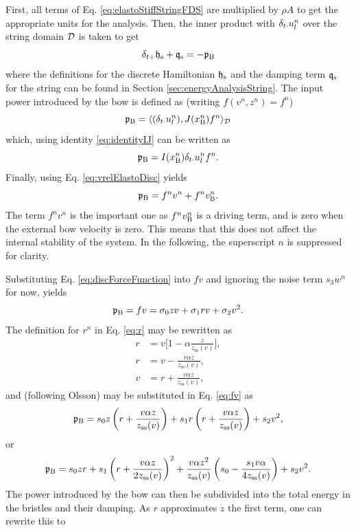 First, all terms of Eq. \eqref{eq:elastoStiffStringFDS} are multiplied by $\rho A$ to get the appropriate units for the analysis. Then, the inner product with $\delta_{t\cdot} u_l^n$ over the string domain $\mathcal{D}$ is taken to get
\begin{equation}
    \delta_{t+} \mathfrak{h}_\text{s} + \mathfrak{q}_\text{s} = -\mathfrak{p}_{\text{B}}
\end{equation}
where the definitions for the discrete Hamiltonian $\mathfrak{h}_\text{s}$ and the damping term $\mathfrak{q}_\text{s}$ for the string can be found in Section \ref{sec:energyAnalysisString}. The input power introduced by the bow is defined as (writing $f(v^n,z^n) = f^n$)
\begin{equation*}
    \mathfrak{p}_{\text{B}} = \langle (\delta_{t\cdot} u_l^n), J(x_{\text{B}}^n)f^n\rangle_{\mathcal{D}}
\end{equation*}
which, using identity \eqref{eq:identityIJ} can be written as 
\begin{equation*}
    \mathfrak{p}_{\text{B}} = I(x_\text{B}^n)\delta_{t\cdot} u_l^n f^n.
\end{equation*}
Finally, using Eq. \eqref{eq:vrelElastoDisc} yields
\begin{equation}
    \mathfrak{p}_{\text{B}} = f^nv^n + f^n v_{\text{B}}^n.
\end{equation}
The term $f^nv^n$ is the important one as $f^nv_{\text{B}}^n$ is a driving term, and is zero when the external bow velocity is zero. This means that this does not affect the internal stability of the system. In the following, the superscript $n$ is suppressed for clarity.

Substituting Eq. \eqref{eq:discForceFunction} into $fv$ and ignoring the noise term $s_3w^n$ for now, yields
\begin{equation}\label{eq:fv}
    \mathfrak{p}_{\text{B}} = fv = \sigma_{0}zv +\sigma_{1}rv+\sigma_{2}v^2.
\end{equation}
The definition for $r^n$ in Eq. \eqref{eq:r} may be rewritten as
\begin{equation*}
    \begin{aligned}
        r &= v\bigg[1-\alpha\frac{z}{z_\text{ss}(v)}\bigg],\\
        r &= v-\frac{v\alpha z}{z_\text{ss}(v)},\\
        v &= r + \frac{v\alpha z}{z_\text{ss}(v)},
    \end{aligned}
\end{equation*}
and (following Olsson) may be substituted in Eq. \eqref{eq:fv} as
\begin{equation}
    \mathfrak{p}_{\text{B}} = s_{0}z\left(r+ \frac{v\alpha z}{z_\text{ss}(v)}\right)+s_{1}r\left(r+ \frac{v\alpha z}{z_\text{ss}(v)}\right)+s_{2}v^2,
\end{equation}
or
\begin{equation}
    \mathfrak{p}_{\text{B}} = s_0zr+s_1\left(r+\frac{v\alpha z}{2z_\text{ss}(v)}\right)^2+\frac{v\alpha z^2}{z_\text{ss}(v)}\left(s_0-\frac{s_1v\alpha}{4z_\text{ss}(v)}\right)+s_2v^2.
\end{equation}
The power introduced by the bow can then be subdivided into the total energy in the bristles and their damping. As $r$ approximates $\dot z$ the first term, one can rewrite this to 

